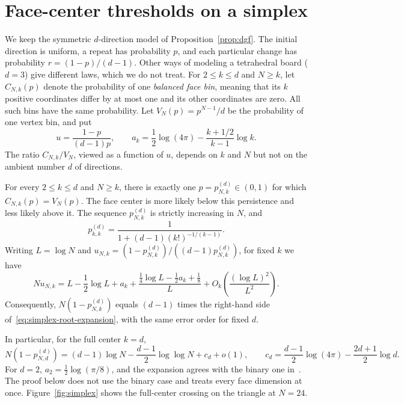 \section{Face-center thresholds on a simplex}\label{sec:simplex-thresholds}

We keep the symmetric $d$-direction model of Proposition~\ref{prop:dgf}. The
initial direction is uniform, a repeat has probability $p$, and each particular
change has probability $r=(1-p)/(d-1)$. Other ways of modeling a tetrahedral
board ($d=3$) give different laws, which we do not treat.
For $2\le k\le d$ and $N\ge k$, let $C_{N,k}(p)$ denote the probability of
one \emph{balanced face bin}, meaning that its $k$ positive coordinates differ by
at most one and its other coordinates are zero. All such bins have the same
probability.
Let $V_N(p)=p^{N-1}/d$ be the probability of one vertex bin, and put
\[
u=\frac{1-p}{(d-1)p},\qquad
a_k=\frac12\log(4\pi)-\frac{k+1/2}{k-1}\log k.
\]
The ratio $C_{N,k}/V_N$, viewed as a function of $u$, depends on $k$ and $N$
but not on the ambient number $d$ of directions.

\begin{theorem}\label{thm:simplex-crossing}
For every $2\le k\le d$ and $N\ge k$, there is exactly one
$p=p_{N,k}^{(d)}\in(0,1)$ for which $C_{N,k}(p)=V_N(p)$.
The face center is more likely below this persistence and less likely above it.
The sequence $p_{N,k}^{(d)}$ is strictly increasing in $N$, and
\[
p_{k,k}^{(d)}=\frac1{1+(d-1)(k!)^{-1/(k-1)}}.
\]
Writing $L=\log N$ and
$u_{N,k}=(1-p_{N,k}^{(d)})/((d-1)p_{N,k}^{(d)})$, for fixed $k$ we have
\begin{equation}\label{eq:simplex-root-expansion}
Nu_{N,k}=L-\frac12\log L+a_k
+\frac{\frac14\log L-\frac12a_k+\frac18}{L}
+O_k\!\left(\frac{(\log L)^2}{L^2}\right).
\end{equation}
Consequently, $N(1-p_{N,k}^{(d)})$ equals $(d-1)$ times the right-hand side
of~\eqref{eq:simplex-root-expansion}, with the same error order for fixed $d$.
\end{theorem}

In particular, for the full center $k=d$,
\[
N(1-p_{N,d}^{(d)})=(d-1)\log N-\frac{d-1}{2}\log\log N+c_d+o(1),
\qquad c_d=\frac{d-1}{2}\log(4\pi)-\frac{2d+1}{2}\log d.
\]
For $d=2$, $a_2=\tfrac12\log(\pi/8)$, and the expansion agrees with the
binary one in~\cite{companion}. The proof below does not use the binary
case and treats every face dimension at once.
Figure~\ref{fig:simplex} shows the full-center crossing on the triangle at
$N=24$.

